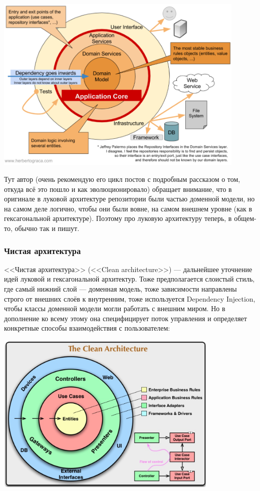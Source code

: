 \documentclass{../../text-style}
\begin{document}
\begin{center}
    \includegraphics[width=0.9\textwidth]{onionArchitectureDetails.png}
\end{center}

Тут автор (очень рекомендую его цикл постов с подробным рассказом о том, откуда всё это пошло и как эволюционировало) обращает внимание, что в оригинале в луковой архитектуре репозитории были частью доменной модели, но на самом деле логично, чтобы они были вовне, на самом внешнем уровне (как в гексагональной архитектуре). Поэтому про луковую архитектуру теперь, в общем-то, обычно так и пишут.

\subsubsection{Чистая архитектура}

<<Чистая архитектура>> (<<Clean architecture>>) --- дальнейшее уточнение идей луковой и гексагональной архитектур. Тоже предполагается слоистый стиль, где самый нижний слой --- доменная модель, тоже зависимости направлены строго от внешних слоёв к внутренним, тоже используется Dependency Injection, чтобы классы доменной модели могли работать с внешним миром. Но в дополнение ко всему этому она специфицирует поток управления и определяет конкретные способы взаимодействия с пользователем:

\begin{center}
    \includegraphics[width=0.8\textwidth]{cleanArchitecture.png}
\end{center}
\end{document}
